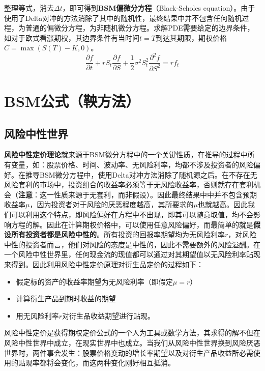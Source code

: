 \documentclass[11pt]{article}
\begin{document}
整理等式，消去$\Delta t$，即可得到\textbf{BSM偏微分方程}（Black-Scholes equation）。由于使用了Delta对冲的方法消除了其中的随机性，最终结果中并不包含任何随机过程，为普通的偏微分方程，为非随机微分方程。求解PDE需要给定的边界条件，如对于欧式看涨期权，其边界条件有当时间$t=T$到达其期限，期权价格$C=\max(S(T)-K,0)$。
\begin{equation*}
    \frac{\partial f}{\partial t} + r S_t \frac{\partial f}{\partial S} + \frac{1}{2} \sigma^2 S_t^2 \frac{\partial^2 f}{\partial S^2} = r f_t
\end{equation*}

\section{BSM公式（鞅方法）}

\subsection{风险中性世界}

\textbf{风险中性定价理论}就来源于BSM微分方程中的一个关键性质，在推导的过程中所有变量，如：股票价格、时间、波动率、无风险利率，均都不涉及投资者的风险偏好。在推导BSM微分方程中，使用Delta对冲方法消除了随机源之后。在不存在无风险套利的市场中，投资组合的收益率必须等于无风险收益率，否则就存在套利机会（\textbf{注意}：这一性质来源于无套利，而非假设）。因此最终结果中中并不包含预期收益率$\mu$，因为投资者对于风险的厌恶程度越高，其所要求的$\mu$也就越高。因此我们可以利用这个特点，即风险偏好在方程中不出现，即其可以随意取值，均不会影响方程的解。因此在计算期权价格中，可以使用任意风险偏好，而最简单的就是\textbf{假设所有投资者都是风险中性的}。所有投资的回报率期望均为无风险利率$r$，对风险中性的投资者而言，他们对风险的态度是中性的，因此不需要额外的风险溢酬。在一个风险中性世界里，任何现金流的现值都可以通过对其期望值以无风险利率贴现来得到。因此利用风险中性定价原理对衍生品定价的过程如下：
\begin{itemize}
    \item 假定标的资产的收益率期望为无风险利率（即假定$\mu=r$）
    \item 计算衍生产品到期时收益的期望
    \item 用无风险利率$r$对衍生品收益期望进行贴现。
\end{itemize}

风险中性定价是获得期权定价公式的一个人为工具或数学方法，其求得的解不但在风险中性世界中成立，在现实世界中也成立。当我们从风险中性世界换到风险厌恶世界时，两件事会发生：股票价格变动的增长率期望以及对衍生产品收益所必需使用的贴现率都将会变化，而这两种变化刚好相互抵消。
\end{document}
